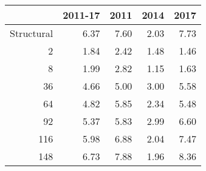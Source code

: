 \begin{table}[ht]
\centering
\begin{tabular}{rrrrr}
  \hline
 & 2011-17 & 2011 & 2014 & 2017 \\ 
  \hline
Structural & 6.37 & 7.60 & 2.03 & 7.73 \\ 
  2 & 1.84 & 2.42 & 1.48 & 1.46 \\ 
  8 & 1.99 & 2.82 & 1.15 & 1.63 \\ 
  36 & 4.66 & 5.00 & 3.00 & 5.58 \\ 
  64 & 4.82 & 5.85 & 2.34 & 5.48 \\ 
  92 & 5.37 & 5.83 & 2.99 & 6.60 \\ 
  116 & 5.98 & 6.88 & 2.04 & 7.47 \\ 
  148 & 6.73 & 7.88 & 1.96 & 8.36 \\ 
   \hline
\end{tabular}
\end{table}

